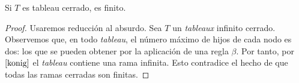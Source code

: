 \begin{prop}
Si $T$ es tableau cerrado, es finito.
\end{prop}

\begin{proof}
Usaremos reducción al absurdo. Sea $T$ un \textit{tableaux} infinito cerrado. Observemos que, en todo \textit{tableau}, el número máximo de hijos de cada nodo es dos: los que se pueden obtener por la aplicación de una regla $\beta$. Por tanto, por $\ref{konig}$ el \textit{tableau} contiene una rama infinita. Esto contradice el hecho de que todas las ramas cerradas son finitas.
\end{proof}